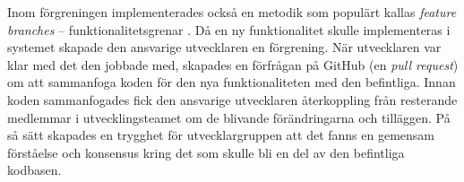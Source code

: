 Inom förgreningen implementerades också en metodik som populärt kallas \emph{feature branches} – funktionalitetsgrenar \cite[kapitel 16]{gitflow}. Då en ny funktionalitet skulle implementeras i systemet skapade den ansvarige utvecklaren en förgrening. När utvecklaren var klar med det den jobbade med, skapades en förfrågan på GitHub (en \emph{pull request}) om att sammanfoga koden för den nya funktionaliteten med den befintliga. Innan koden sammanfogades fick den ansvarige utvecklaren återkoppling från resterande medlemmar i utvecklingsteamet om de blivande förändringarna och tilläggen. På så sätt skapades en trygghet för utvecklargruppen att det fanns en gemensam förståelse och konsensus kring det som skulle bli en del av den befintliga kodbasen.

